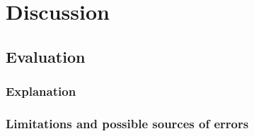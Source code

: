 \section{Discussion}
\label{sec:discussion}

\subsection{Evaluation}
\label{sec:evaluation}

\subsubsection{Explanation}
\label{sec:explanation}

\subsubsection{Limitations and possible sources of errors}
\label{sec:limitations}